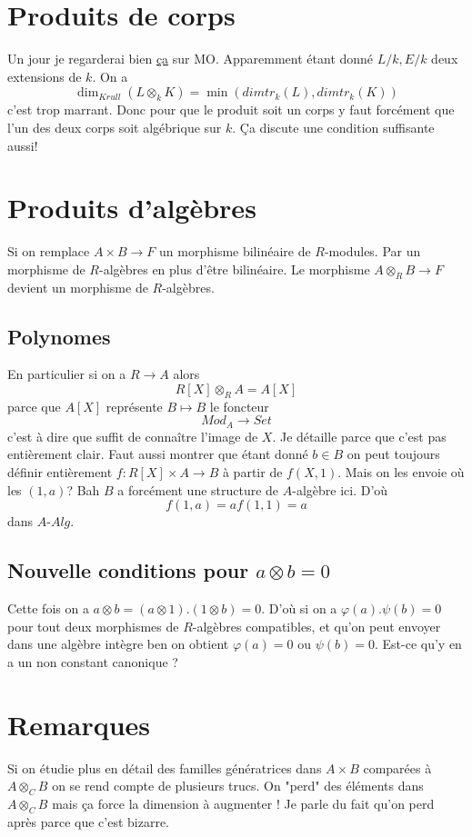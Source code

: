 \documentclass[a4paper,12pt]{article}
\theoremstyle{plain}
\theoremstyle{definition}
\theoremstyle{remark}
\begin{document}
\section{Produits de corps}
Un jour je regarderai bien  
\href{https://mathoverflow.net/questions/82083/when-is-the-tensor-product-of-two-fields-a-field}{ça} sur MO.
Apparemment étant donné $L/k, E/k$ deux extensions de $k$. On a
\[\dim_{Krull}(L\otimes_k K)=\min(dimtr_k(L),dimtr_k(K))\]
c'est trop marrant. Donc pour que le produit soit un corps
y faut forcément que l'un des deux corps soit algébrique sur $k$.
Ça discute une condition suffisante aussi!

\section{Produits d'algèbres}
Si on remplace $A\times B\to F$ un morphisme bilinéaire de 
$R$-modules. Par un morphisme de $R$-algèbres en plus d'être 
bilinéaire. Le morphisme $A\otimes_R B\to F$ devient un morphisme
de $R$-algèbres.
\subsection{Polynomes}
En particulier si on a $R\to A$ alors
\[R[X]\otimes_R A=A[X]\]
parce que $A[X]$ représente $B\mapsto B$ le foncteur 
\[Mod_A\to Set\]
c'est à dire que suffit de connaître l'image de $X$. 
Je détaille parce que c'est pas entièrement clair.
Faut aussi montrer que étant donné $b\in B$ on peut
toujours définir entièrement $f\colon R[X]\times A\to B$ 
à partir de $f(X,1)$. Mais on les envoie où les
$(1,a)$? Bah $B$ a forcément une structure de $A$-algèbre
ici. D'où 
\[f(1,a)=af(1,1)=a\]
dans $A$-$Alg$.

\subsection{Nouvelle conditions pour $a\otimes b=0$}
Cette fois on a $a\otimes b=(a\otimes 1).(1\otimes b)=0$. D'où
si on a $\varphi(a).\psi(b)=0$ pour tout deux morphismes de
$R$-algèbres compatibles, et qu'on peut envoyer dans une algèbre
intègre ben on obtient $\varphi(a)=0$ ou $\psi(b)=0$. Est-ce 
qu'y en a un non constant canonique ?

\section{Remarques}
Si on étudie plus en détail des familles génératrices dans 
$A\times B$ comparées à $A\otimes_C B$ on se rend compte de 
plusieurs trucs. On "perd" des éléments dans $A\otimes_C B$ mais
ça force la dimension à augmenter ! Je parle du fait qu'on perd
après parce que c'est bizarre.
\end{document}
